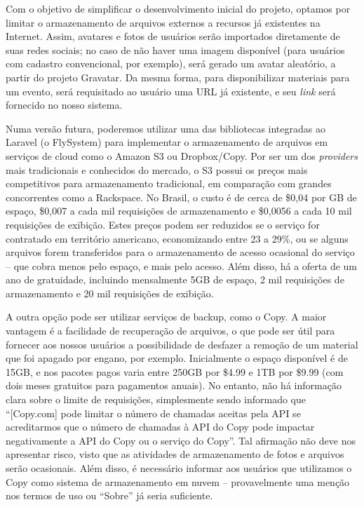 \documentclass[12pt,a4paper,twoside,hyphens,english,brazil]{abntex2}
\begin{document}
{Com o objetivo de simplificar o desenvolvimento inicial do projeto, optamos por limitar o armazenamento de arquivos externos a recursos já existentes na Internet. Assim, avatares e fotos de usuários serão importados diretamente de suas redes sociais; no caso de não haver uma imagem disponível (para usuários com cadastro convencional, por exemplo), será gerado um avatar aleatório, a partir do projeto Gravatar\footnotemark. Da mesma forma, para disponibilizar materiais para um evento, será requisitado ao usuário uma URL já existente, e seu \emph{link} será fornecido no nosso sistema.

Numa versão futura, poderemos utilizar uma das bibliotecas integradas ao Laravel (o FlySystem\cite{laravel-flysystem}) para implementar o armazenamento de arquivos em serviços de cloud como o Amazon S3 ou Dropbox/Copy\cite{flysystem}. Por ser um dos \emph{providers} mais tradicionais e conhecidos do mercado, o S3 possui os preços mais competitivos para armazenamento tradicional, em comparação com grandes concorrentes como a Rackspace. No Brasil, o custo é de cerca de \$0,04 por GB de espaço, \$0,007 a cada mil requisições de armazenamento e \$0,0056 a cada 10 mil requisições de exibição. Estes preços podem ser reduzidos se o serviço for contratado em território americano, economizando entre 23 a 29\%, ou se alguns arquivos forem transferidos para o armazenamento de acesso ocasional do serviço -- que cobra menos pelo espaço, e mais pelo acesso. Além disso, há a oferta de um ano de gratuidade, incluindo mensalmente 5GB de espaço, 2 mil requisições de armazenamento e 20 mil requisições de exibição.\cite{s3-pricing}

A outra opção pode ser utilizar serviços de backup, como o Copy. A maior vantagem é a facilidade de recuperação de arquivos, o que pode ser útil para fornecer aos nossos usuários a possibilidade de desfazer a remoção de um material que foi apagado por engano, por exemplo. Inicialmente o espaço disponível é de 15GB, e nos pacotes pagos varia entre 250GB por \$4.99 e 1TB por \$9.99 (com dois meses gratuitos para pagamentos anuais). No entanto, não há informação clara sobre o limite de requisições, simplesmente sendo informado que ``[Copy.com] pode limitar o número de chamadas aceitas pela API se acreditarmos que o número de chamadas à API do Copy pode impactar negativamente a API do Copy ou o serviço do Copy''\cite{copy-tos}. Tal afirmação não deve nos apresentar risco, visto que as atividades de armazenamento de fotos e arquivos serão ocasionais. Além disso, é necessário informar aos usuários que utilizamos o Copy como sistema de armazenamento em nuvem\cite{copy-tos} -- provavelmente uma menção nos termos de uso ou ``Sobre'' já seria suficiente.


}
\end{document}

